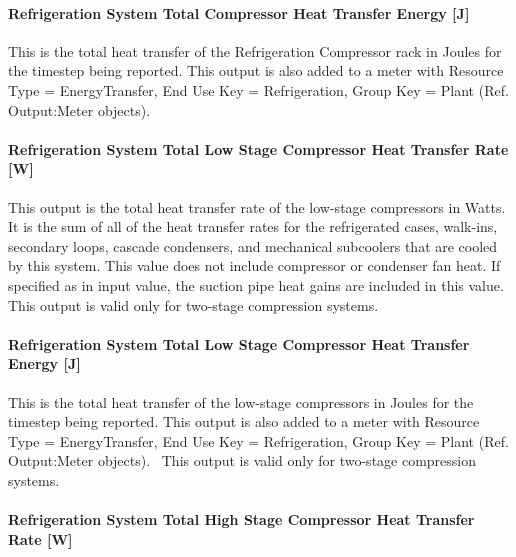 \paragraph{Refrigeration System Total Compressor Heat Transfer Energy {[}J{]}}\label{refrigeration-system-total-compressor-heat-transfer-energy-j}

This is the total heat transfer of the Refrigeration Compressor rack in Joules for the timestep being reported. This output is also added to a meter with Resource Type = EnergyTransfer, End Use Key = Refrigeration, Group Key = Plant (Ref. Output:Meter objects).

\paragraph{Refrigeration System Total Low Stage Compressor Heat Transfer Rate {[}W{]}}\label{refrigeration-system-total-low-stage-compressor-heat-transfer-rate-w}

This output is the total heat transfer rate of the low-stage compressors in Watts. It is the sum of all of the heat transfer rates for the refrigerated cases, walk-ins, secondary loops, cascade condensers, and mechanical subcoolers that are cooled by this system. This value does not include compressor or condenser fan heat. If specified as in input value, the suction pipe heat gains are included in this value.~ This output is valid only for two-stage compression systems.

\paragraph{Refrigeration System Total Low Stage Compressor Heat Transfer Energy {[}J{]}}\label{refrigeration-system-total-low-stage-compressor-heat-transfer-energy-j}

This is the total heat transfer of the low-stage compressors in Joules for the timestep being reported. This output is also added to a meter with Resource Type = EnergyTransfer, End Use Key = Refrigeration, Group Key = Plant (Ref. Output:Meter objects).~ This output is valid only for two-stage compression systems.

\paragraph{Refrigeration System Total High Stage Compressor Heat Transfer Rate {[}W{]}}\label{refrigeration-system-total-high-stage-compressor-heat-transfer-rate-w}

